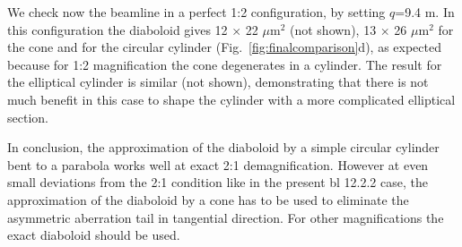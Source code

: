 \documentclass{iucr}              %
\newcommand{\inred}[1]{{\color{red}#1}}
\begin{document}
We check now the beamline in a perfect 1:2 configuration, by setting $q$=9.4 m. In this configuration the diaboloid gives 12 $\times$ 22 $\mu$m$^2$ (not shown), 13 $\times$ 26 $\mu$m$^2$ for the cone and for the circular cylinder (Fig.~\ref{fig:finalcomparison}d), as expected because for 1:2 magnification the cone degenerates in a cylinder. The result for the elliptical cylinder is similar (not shown), demonstrating that there is not much benefit in this case to shape the cylinder with a more complicated elliptical section.   


In conclusion, \inred{the approximation of the diaboloid by a simple circular cylinder bent to a parabola works well at exact 2:1 demagnification. However at even small deviations from the 2:1 condition like in the present bl 12.2.2 case, the approximation of the diaboloid by a cone has to be used to eliminate the asymmetric aberration tail in tangential direction. For other magnifications the exact diaboloid should be used.}

\end{document}
